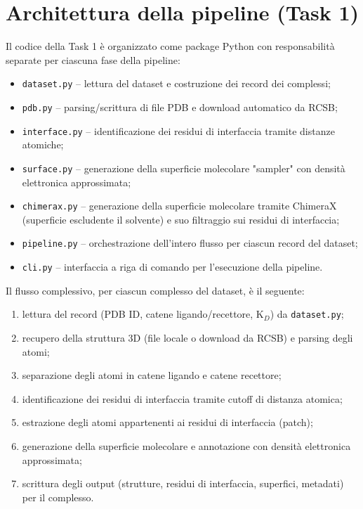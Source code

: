 \documentclass[11pt,a4paper]{article}
\begin{document}
\section{Architettura della pipeline (Task 1)}
Il codice della Task 1 è organizzato come package Python con responsabilità separate per ciascuna fase della pipeline:

\begin{itemize}
    \item \texttt{dataset.py} -- lettura del dataset e costruzione dei record dei complessi;
    \item \texttt{pdb.py} -- parsing/scrittura di file PDB e download automatico da RCSB;
    \item \texttt{interface.py} -- identificazione dei residui di interfaccia tramite distanze atomiche;
    \item \texttt{surface.py} -- generazione della superficie molecolare "sampler" con densità elettronica approssimata;
    \item \texttt{chimerax.py} -- generazione della superficie molecolare tramite ChimeraX (superficie escludente il solvente) e suo filtraggio sui residui di interfaccia;
    \item \texttt{pipeline.py} -- orchestrazione dell'intero flusso per ciascun record del dataset;
    \item \texttt{cli.py} -- interfaccia a riga di comando per l'esecuzione della pipeline.
\end{itemize}

Il flusso complessivo, per ciascun complesso del dataset, è il seguente:
\begin{enumerate}
    \item lettura del record (PDB ID, catene ligando/recettore, K$_D$) da \texttt{dataset.py};
    \item recupero della struttura 3D (file locale o download da RCSB) e parsing degli atomi;
    \item separazione degli atomi in catene ligando e catene recettore;
    \item identificazione dei residui di interfaccia tramite cutoff di distanza atomica;
    \item estrazione degli atomi appartenenti ai residui di interfaccia (patch);
    \item generazione della superficie molecolare e annotazione con densità elettronica approssimata;
    \item scrittura degli output (strutture, residui di interfaccia, superfici, metadati) per il complesso.
\end{enumerate}
\end{document}
